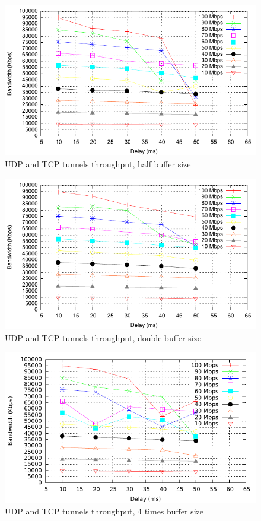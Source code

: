 \begin{figure}
  \centering
  \includegraphics[width=\textwidth]{img/test-mptcp-05}
  \caption{UDP and TCP tunnels throughput, half buffer size}
  \label{fig:mptcp-0.5}
\end{figure}

\begin{figure}
  \centering
  \includegraphics[width=\textwidth]{img/test-mptcp-2}
  \caption{UDP and TCP tunnels throughput, double buffer size}
  \label{fig:mptcp-2}
\end{figure}

\begin{figure}
  \centering
  \includegraphics[width=\textwidth]{img/test-mptcp-4}
  \caption{UDP and TCP tunnels throughput, 4 times buffer size}
  \label{fig:mptcp-4}
\end{figure}

